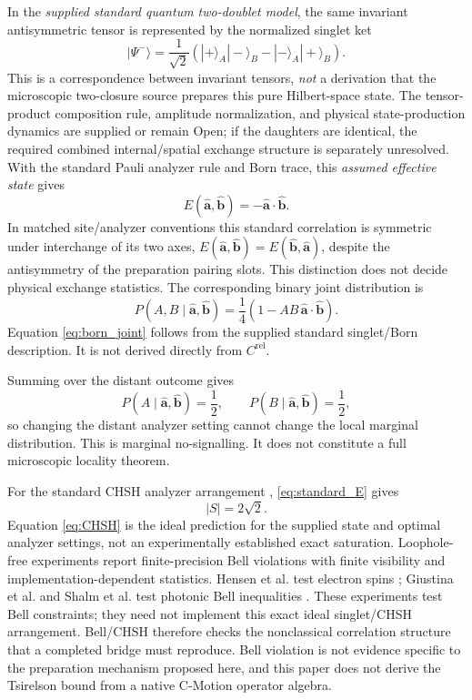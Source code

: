 \documentclass[11pt]{article}
\theoremstyle{remark}
\newcommand{\cmotion}{\mbox{C-Motion}}
\newcommand{\ahat}{\hat{\bm a}}
\newcommand{\bhat}{\hat{\bm b}}
\newcommand{\Crel}{C^{\mathrm{rel}}}
\begin{document}
In the \emph{supplied standard quantum two-doublet model}, the same invariant
antisymmetric tensor is represented by the normalized singlet ket
\begin{equation}
  |\Psi^-\rangle
  =\frac{1}{\sqrt2}
  \left(|+\rangle_A|-\rangle_B-|-\rangle_A|+\rangle_B\right).
  \label{eq:singlet_state}
\end{equation}
This is a correspondence between invariant tensors, \emph{not} a derivation
that the microscopic two-closure source prepares this pure Hilbert-space state.
The tensor-product composition rule, amplitude normalization, and physical
state-production dynamics are supplied or remain Open; if the daughters are
identical, the required combined internal/spatial exchange structure is
separately unresolved.  With the standard Pauli analyzer rule and Born trace,
this \emph{assumed effective state} gives
\begin{equation}
  E(\ahat,\bhat)=-\ahat\cdot\bhat.
  \label{eq:standard_E}
\end{equation}
In matched site/analyzer conventions this standard correlation is symmetric
under interchange of its two axes, \(E(\ahat,\bhat)=E(\bhat,\ahat)\),
despite the antisymmetry of the preparation pairing slots.  This
distinction does not decide physical exchange statistics.
The corresponding binary joint distribution is
\begin{equation}
  \boxed{
  P(A,B\mid\ahat,\bhat)
  =\frac14\left(1-AB\,\ahat\cdot\bhat\right).}
  \label{eq:born_joint}
\end{equation}
Equation \eqref{eq:born_joint} follows from the supplied standard singlet/Born description.  It is not
derived directly from \(\Crel\).

Summing over the distant outcome gives
\begin{equation}
  P(A\mid\ahat,\bhat)=\frac12,
  \qquad
  P(B\mid\ahat,\bhat)=\frac12,
  \label{eq:marginals}
\end{equation}
so changing the distant analyzer setting cannot change the local marginal distribution.  This is
marginal no-signalling.  It does not constitute a full microscopic locality theorem.

For the standard CHSH analyzer arrangement \cite{CHSH1969,Tsirelson1980},
\eqref{eq:standard_E} gives
\begin{equation}
  |S|=2\sqrt2.
  \label{eq:CHSH}
\end{equation}
Equation \eqref{eq:CHSH} is the ideal prediction for the supplied state and
optimal analyzer settings, not an experimentally established exact saturation.
Loophole-free experiments report finite-precision Bell violations with
finite visibility and implementation-dependent statistics.  Hensen et al.
test electron spins \cite{Hensen2015LoopholeFree}; Giustina et al. and
Shalm et al. test photonic Bell inequalities
\cite{Giustina2015LoopholeFree,Shalm2015LoopholeFree}.
These experiments test Bell constraints; they need not implement this
exact ideal singlet/CHSH arrangement.  Bell/CHSH therefore checks the
nonclassical correlation structure that a completed bridge must reproduce.  Bell violation is not evidence specific to the preparation
mechanism proposed here, and this paper does not derive the Tsirelson bound from a native \cmotion{}
operator algebra.
\end{document}
